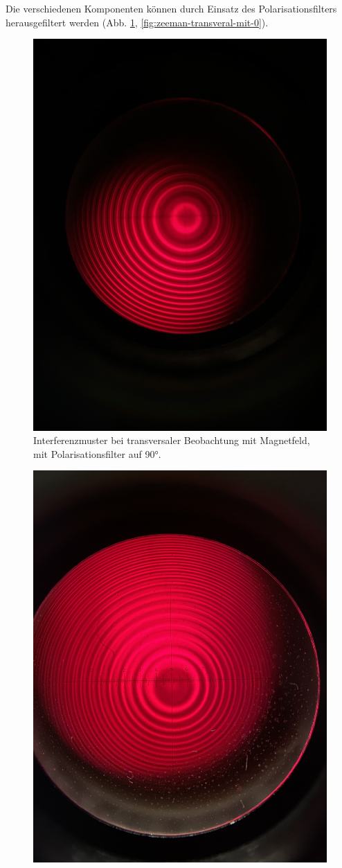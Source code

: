 \documentclass{article}
\begin{document}
\begin{multicols}{2}
Die verschiedenen Komponenten können durch Einsatz des Polarisationsfilters herausgefiltert werden (Abb. \ref{fig:zeeman-transveral-mit-90}, \ref{fig:zeeman-transveral-mit-0}).
\begin{figure}[H]
  \centering
  \includegraphics[width=.8\linewidth]{zeeman-transversal-mit-90}
  \caption{Interferenzmuster bei transversaler Beobachtung mit Magnetfeld, mit Polarisationsfilter auf \ang{90}.}
  \label{fig:zeeman-transveral-mit-90}
\end{figure}
\begin{figure}[H]
  \centering
  \includegraphics[width=.8\linewidth]{zeeman-transversal-mit-0}

\end{figure}
\end{multicols}
\end{document}
